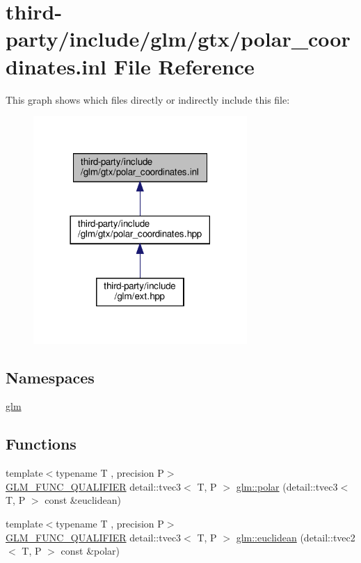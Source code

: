 \hypertarget{polar__coordinates_8inl}{}\section{third-\/party/include/glm/gtx/polar\+\_\+coordinates.inl File Reference}
\label{polar__coordinates_8inl}
This graph shows which files directly or indirectly include this file\+:
\nopagebreak
\begin{figure}[H]
\begin{center}
\leavevmode
\includegraphics[width=230pt]{polar__coordinates_8inl__dep__incl}
\end{center}
\end{figure}
\subsection*{Namespaces}
\begin{DoxyCompactItemize}
\item 
 \hyperlink{namespaceglm}{glm}
\end{DoxyCompactItemize}
\subsection*{Functions}
\begin{DoxyCompactItemize}
\item 
{\footnotesize template$<$typename T , precision P$>$ }\\\hyperlink{setup_8hpp_a33fdea6f91c5f834105f7415e2a64407}{G\+L\+M\+\_\+\+F\+U\+N\+C\+\_\+\+Q\+U\+A\+L\+I\+F\+I\+ER} detail\+::tvec3$<$ T, P $>$ \hyperlink{group__gtx__polar__coordinates_ga7d0a4068875efec56e5d2c6451b5bde2}{glm\+::polar} (detail\+::tvec3$<$ T, P $>$ const \&euclidean)
\item 
{\footnotesize template$<$typename T , precision P$>$ }\\\hyperlink{setup_8hpp_a33fdea6f91c5f834105f7415e2a64407}{G\+L\+M\+\_\+\+F\+U\+N\+C\+\_\+\+Q\+U\+A\+L\+I\+F\+I\+ER} detail\+::tvec3$<$ T, P $>$ \hyperlink{group__gtx__polar__coordinates_ga221eaf671619626425e9fb5cb69400b0}{glm\+::euclidean} (detail\+::tvec2$<$ T, P $>$ const \&polar)
\end{DoxyCompactItemize}
